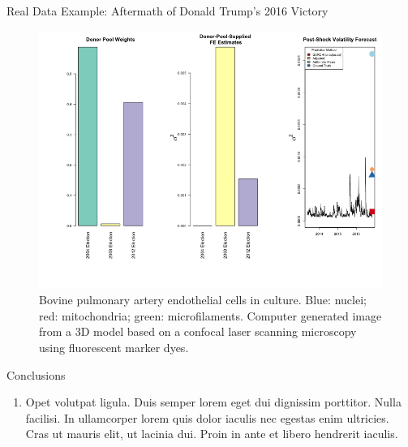 \documentclass{beamer} %
\begin{document}
\begin{frame}[t]
\begin{columns}[t]
\begin{column}{0.465\textwidth}

\begin{block}{Real Data Example: Aftermath of Donald Trump's 2016 Victory}
	\begin{figure}
		\includegraphics[width=\linewidth]{../real_data_output_plots/FriMay311830522024_IYG_None_2016-06-22.png}
		\caption{Bovine pulmonary artery endothelial cells in culture. Blue: nuclei; red: mitochondria; green: microfilaments. Computer generated image from a 3D model based on a confocal laser scanning microscopy using fluorescent marker dyes.}
	\end{figure}
\end{block}


\begin{block}{Conclusions}
	\begin{enumerate}
		\item \alert{Opet volutpat ligula.} Duis semper lorem eget dui dignissim porttitor. Nulla facilisi. In ullamcorper lorem quis dolor iaculis nec egestas enim ultricies. Cras ut mauris elit, ut lacinia dui. Proin in ante et libero hendrerit iaculis.
	\end{enumerate}
\end{block}



\end{column}
\end{columns}
\end{frame}
\end{document}
